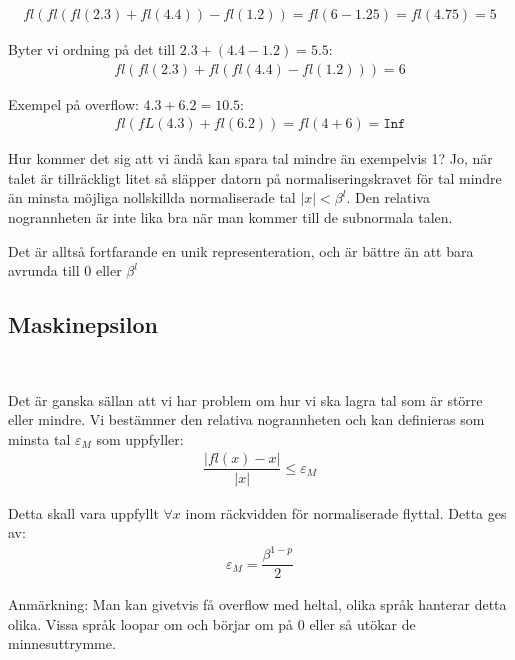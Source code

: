 \begin{equation*}
  \begin{gathered}
    fl(fl(fl(2.3)+fl(4.4))-fl(1.2)) = fl(6-1.25) = fl(4.75) = 5
  \end{gathered}
\end{equation*}\par
\noindent Byter vi ordning på det till $2.3+(4.4-1.2)=5.5$:
\begin{equation*}
  \begin{gathered}
    fl(fl(2.3)+fl(fl(4.4)-fl(1.2))) = 6
  \end{gathered}
\end{equation*}
\par\bigskip
\noindent Exempel på overflow: $4.3+6.2=10.5$:
\begin{equation*}
  \begin{gathered}
    fl(fL(4.3)+fl(6.2)) = fl(4+6) = \texttt{Inf}
  \end{gathered}
\end{equation*}
\par\bigskip
\noindent Hur kommer det sig att vi ändå kan spara tal mindre än exempelvis 1? Jo, när talet är tillräckligt litet så släpper datorn på normaliseringskravet för tal mindre än minsta möjliga nollskillda normaliserade tal $\left|x\right| < \beta^l$. Den relativa nogrannheten är inte lika bra när man kommer till de subnormala talen.\par
\noindent Det är alltså fortfarande en unik representeration, och är bättre än att bara avrunda till 0 eller $\beta^l$ 
\par\bigskip
\subsection{Maskinepsilon}\hfill\\
\par\bigskip
\noindent Det är ganska sällan att vi har problem om hur vi ska lagra tal som är större eller mindre. Vi bestämmer den relativa nogrannheten och kan definieras som minsta tal $\varepsilon_M$ som uppfyller:
\begin{equation*}
  \begin{gathered}
    \dfrac{\left|fl(x)-x\right|}{\left|x\right|}\leq\varepsilon_M
  \end{gathered}
\end{equation*}\par
\noindent Detta skall vara uppfyllt $\forall x$ inom räckvidden för normaliserade flyttal. Detta ges av:
\begin{equation*}
  \begin{gathered}
    \varepsilon_M = \dfrac{\beta^{1-p}}{2}
  \end{gathered}
\end{equation*}
\par\bigskip
\noindent Anmärkning: Man kan givetvis få overflow med heltal, olika språk hanterar detta olika. Vissa språk loopar om och börjar om på 0 eller så utökar de minnesuttrymme.
